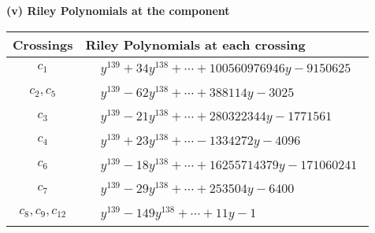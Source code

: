 \documentclass[1p]{elsarticle_modified}
\theoremstyle{definition}
\begin{document}
\newpage\renewcommand{\arraystretch}{1}
\flushleft \textbf{(v) Riley Polynomials at the component}\newline \\
\begin{tabular}{m{50pt}|m{274pt}}
Crossings & \hspace{64pt}Riley Polynomials at each crossing \\
\hline $$\begin{aligned}c_{1}\end{aligned}$$&$\begin{aligned}
&y^{139}+34 y^{138}+\cdots+100560976946 y-9150625
\end{aligned}$\\
\hline $$\begin{aligned}c_{2},c_{5}\end{aligned}$$&$\begin{aligned}
&y^{139}-62 y^{138}+\cdots+388114 y-3025
\end{aligned}$\\
\hline $$\begin{aligned}c_{3}\end{aligned}$$&$\begin{aligned}
&y^{139}-21 y^{138}+\cdots+280322344 y-1771561
\end{aligned}$\\
\hline $$\begin{aligned}c_{4}\end{aligned}$$&$\begin{aligned}
&y^{139}+23 y^{138}+\cdots-1334272 y-4096
\end{aligned}$\\
\hline $$\begin{aligned}c_{6}\end{aligned}$$&$\begin{aligned}
&y^{139}-18 y^{138}+\cdots+16255714379 y-171060241
\end{aligned}$\\
\hline $$\begin{aligned}c_{7}\end{aligned}$$&$\begin{aligned}
&y^{139}-29 y^{138}+\cdots+253504 y-6400
\end{aligned}$\\
\hline $$\begin{aligned}c_{8},c_{9},c_{12}\end{aligned}$$&$\begin{aligned}
&y^{139}-149 y^{138}+\cdots+11 y-1
\end{aligned}$\\

\end{tabular}
\end{document}
